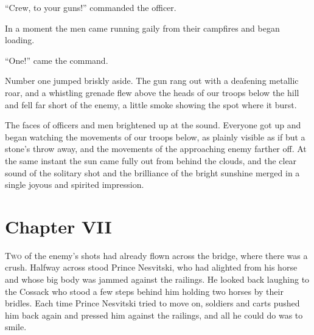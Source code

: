 ``Crew, to your guns!'' commanded the officer.

In a moment the men came running gaily from their campfires and
began loading.

``One!'' came the command.

Number one jumped briskly aside. The gun rang out with a
deafening metallic roar, and a whistling grenade flew above the
heads of our troops below the hill and fell far short of the
enemy, a little smoke showing the spot where it burst.

The faces of officers and men brightened up at the
sound. Everyone got up and began watching the movements of our
troops below, as plainly visible as if but a stone's throw away,
and the movements of the approaching enemy farther off. At the
same instant the sun came fully out from behind the clouds, and
the clear sound of the solitary shot and the brilliance of the
bright sunshine merged in a single joyous and spirited
impression.


\chapter*{Chapter VII}
\ifaudio     {} \fi

\lettrine[lines=2, loversize=0.3, lraise=0]{\initfamily T}{wo}
of the enemy's shots had already flown across the bridge,
where there was a crush. Halfway across stood Prince Nesvitski,
who had alighted from his horse and whose big body was jammed
against the railings. He looked back laughing to the Cossack who
stood a few steps behind him holding two horses by their
bridles. Each time Prince Nesvitski tried to move on, soldiers
and carts pushed him back again and pressed him against the
railings, and all he could do was to smile.

